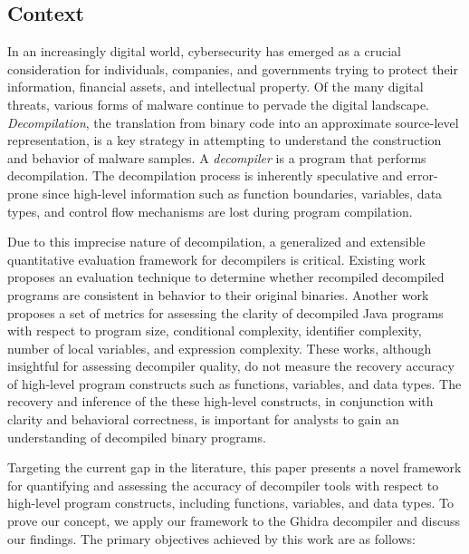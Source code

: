\documentclass[a4paper,twoside]{article}
\begin{document}
\subsection{Context}

In an increasingly digital world, cybersecurity has emerged as a crucial consideration for individuals, companies, and governments trying to protect their information, financial assets, and intellectual property. Of the many digital threats, various forms of malware continue to pervade the digital landscape. \emph{Decompilation}, the translation from binary code into an approximate source-level representation, is a key strategy in attempting to understand the construction and behavior of malware samples. A \emph{decompiler} is a program that performs decompilation. The decompilation process is inherently speculative and error-prone since high-level information such as function boundaries, variables, data types, and control flow mechanisms are lost during program compilation. 

Due to this imprecise nature of decompilation, a generalized and extensible quantitative evaluation framework for decompilers is critical. Existing work \cite{bib:how-far-weve-come} proposes an evaluation technique to determine whether recompiled decompiled programs are consistent in behavior to their original binaries. Another work \cite{bib:metrics-effectiveness-decompilers} proposes a set of metrics for assessing the clarity of decompiled Java programs with respect to program size, conditional complexity, identifier complexity, number of local variables, and expression complexity. These works, although insightful for assessing decompiler quality, do not measure the recovery accuracy of high-level program constructs such as functions, variables, and data types. The recovery and inference of the these high-level constructs, in conjunction with clarity and behavioral correctness, is important for analysts to gain an understanding of decompiled binary programs.

Targeting the current gap in the literature, this paper presents a novel framework for quantifying and assessing the accuracy of decompiler tools with respect to high-level program constructs, including functions, variables, and data types. To prove our concept, we apply our framework to the Ghidra \cite{bib:ghidra} decompiler and discuss our findings. The primary objectives achieved by this work are as follows:
\end{document}
